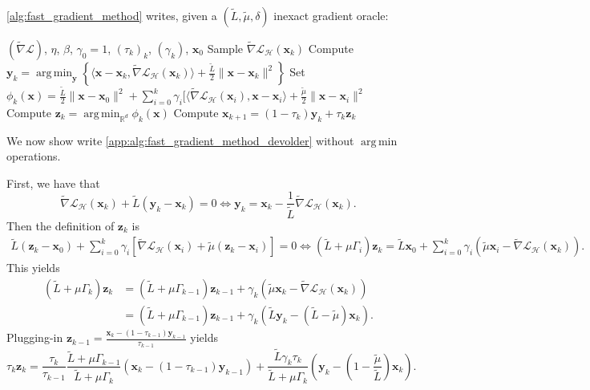 \documentclass{article}
\def\vx{{\bm{x}}}
\def\vy{{\bm{y}}}
\def\vz{{\bm{z}}}
\newcommand{\tens}[1]{\bm{\mathsfit{#1}}}
\def\tL{{\tens{L}}}
\newcommand{\R}{\mathbb{R}}
\DeclareMathOperator*{\argmin}{arg\,min}
\renewcommand{\tL}{\tilde{L}}
\newcommand{\tmu}{\tilde{\mu}}
\newcommand{\cH}{\mathcal{H}}
\newcommand{\cL}{\mathcal{L}}
\theoremstyle{plain}
\theoremstyle{definition}
\theoremstyle{remark}
\begin{document}
\cref{alg:fast_gradient_method} writes, given a $(\tL,\tmu,\delta)$ inexact gradient oracle:

\begin{algorithm}[h]
  \caption{Inexact Oracle Fast Gradient Method}
  \label{app:alg:fast_gradient_method_devolder}
  \begin{algorithmic}
     $(\tilde\nabla \cL)$, $\eta$, $\beta$, $\gamma_0 = 1$, $(\tau_k)_k$, $(\gamma_k)$, $\vx_0$
     \STATE Sample $\tilde\nabla \cL_{\cH}(\vx_k)$
    \STATE Compute $\vy_{k} = \argmin_{\vy}\left\{\langle \vx -\vx_k, \tilde{\nabla}\cL_{\cH}(\vx_k)\rangle + \frac{\tL}{2}\|\vx - \vx_k\|^2\right\}$ 
    \STATE Set $\phi_k(\vx) = \frac{\tL}{2}\|\vx-\vx_0\|^2 + \sum_{i=0}^k \gamma_i[\langle\tilde{\nabla}\cL_{\cH}(\vx_i), \vx - \vx_i\rangle + \frac{\tmu}{2}\|\vx - \vx_i\|^2$
    \STATE Compute $\vz_k = \argmin_{\R^d}\phi_k(\vx)$
    \STATE Compute $\vx_{k+1} = (1-\tau_k)\vy_k + \tau_k \vz_k$
    \ENDFOR
  \end{algorithmic}
\end{algorithm}
We now show write \cref{app:alg:fast_gradient_method_devolder} without $\argmin$ operations.

First, we have that 
\[
\tilde{\nabla}\cL_{\cH}(\vx_k) + \tL(\vy_k - \vx_k) = 0 \iff \vy_k = \vx_k - \frac{1}{\tL}\tilde{\nabla}\cL_{\cH}(\vx_k).
\]
Then the definition of $\vz_k$ is
\begin{align*}
    \tL(\vz_k - \vx_0) + \sum_{i=0}^k \gamma_i[\tilde{\nabla}\cL_{\cH}(\vx_i) + \tmu (\vz_k - \vx_i)] = 0 \iff (\tL +\mu \Gamma_i) \vz_k = \tL\vx_0 + \sum_{i=0}^k \gamma_i(\tmu \vx_i - \tilde{\nabla}\cL_{\cH}(\vx_k)).
\end{align*}
This yields 
\begin{align*}
    (\tL +\mu \Gamma_k) \vz_k &= (\tL +\mu \Gamma_{k-1}) \vz_{k-1} + \gamma_k(\tmu \vx_k - \tilde{\nabla}\cL_{\cH}(\vx_k))\\
    &= (\tL +\mu \Gamma_{k-1}) \vz_{k-1} + \gamma_k( \tL \vy_k - (\tL-\tmu) \vx_k).
\end{align*}
Plugging-in $\vz_{k-1} = \frac{\vx_k - (1-\tau_{k-1})\vy_{k-1}}{\tau_{k-1}}$ yields
\begin{equation}
\label{app:eq:identity1}
\tau_k\vz_k = \frac{\tau_k}{\tau_{k-1}}\frac{\tL +\mu \Gamma_{k-1}}{\tL +\mu \Gamma_{k}} (\vx_k - (1-\tau_{k-1})\vy_{k-1}) + \frac{\tL\gamma_k \tau_k}{\tL +\mu \Gamma_{k}}(  \vy_k - (1-\frac{\tmu}{\tL}) \vx_k).
\end{equation}
\end{document}
